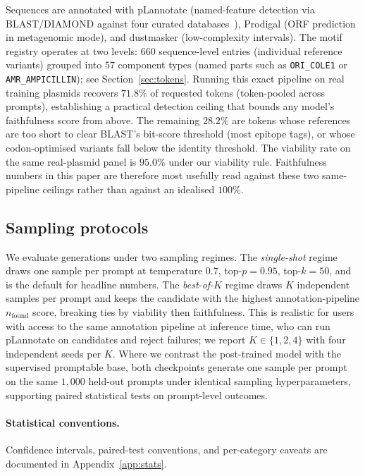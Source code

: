 \documentclass{article}
\begin{document}
Sequences are annotated with pLannotate (named-feature detection via BLAST/DIAMOND
against four curated databases~\citep{mcguffie2021plannotate}), Prodigal (ORF prediction
in metagenomic mode), and dustmasker (low-complexity intervals). The motif registry
operates at two levels: $660$ sequence-level entries (individual reference variants)
grouped into $57$ component types (named parts such as \texttt{ORI\_COLE1} or
\texttt{AMR\_AMPICILLIN}); see Section~\ref{sec:tokens}. Running this exact pipeline on
real training plasmids recovers $71.8\%$ of requested tokens (token-pooled across
prompts), establishing a practical detection ceiling that bounds any model's
faithfulness score from above. The remaining $28.2\%$ are tokens whose references are
too short to clear BLAST's bit-score threshold (most epitope tags), or whose
codon-optimised variants fall below the identity threshold. The viability rate on the
same real-plasmid panel is $95.0\%$ under our viability rule. Faithfulness numbers in
this paper are therefore most usefully read against these two same-pipeline ceilings
rather than against an idealised $100\%$.

\subsection{Sampling protocols}
\label{sec:sampling}

We evaluate generations under two sampling regimes. The \emph{single-shot} regime draws
one sample per prompt at temperature $0.7$, top-$p{=}0.95$, top-$k{=}50$, and is the
default for headline numbers. The \emph{best-of-$K$} regime draws $K$ independent
samples per prompt and keeps the candidate with the highest annotation-pipeline
$n_{\text{found}}$ score, breaking ties by viability then faithfulness. This is realistic
for users with access to the same annotation pipeline at inference time, who can run
pLannotate on candidates and reject failures; we report $K\in\{1, 2, 4\}$ with four
independent seeds per $K$. Where we contrast the post-trained model with the supervised
promptable base, both checkpoints generate one sample per prompt on the same $1{,}000$
held-out prompts under identical sampling hyperparameters, supporting paired statistical
tests on prompt-level outcomes.

\paragraph{Statistical conventions.}
Confidence intervals, paired-test conventions, and per-category caveats are documented
in Appendix~\ref{app:stats}.
\end{document}
